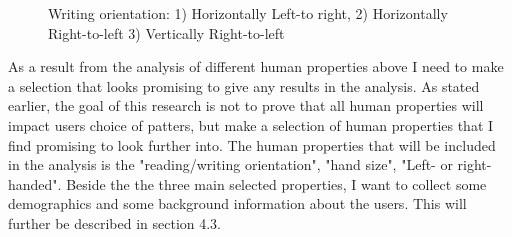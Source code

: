   \begin{figure}[H]
    \centering
    \caption{Writing orientation: 1) Horizontally Left-to right, 2) Horizontally Right-to-left 3) Vertically Right-to-left}
  \end{figure}

  As a result from the analysis of different human properties above I need to make a selection that looks promising to give any results in the analysis. As stated earlier, the goal of this research is not to prove that all human properties will impact users choice of patters, but make a selection of human properties that I find promising to look further into. The human properties that will be included in the analysis is the  "reading/writing orientation", "hand size", "Left- or right-handed". 
  Beside the the three main selected properties, I want to collect some demographics and some background information about the users. This will further be described in section 4.3.

